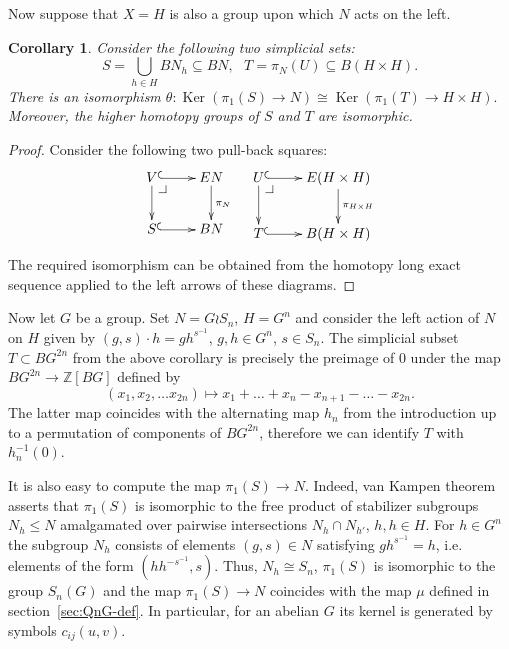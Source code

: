 \documentclass[oneside, 10pt]{amsart}
\makeatletter
\theoremstyle{plain}
\numberwithin{equation}{section}
\numberwithin{lemma}{section}
\newtheorem{cor}[lemma]{Corollary}
\theoremstyle{remark}
\theoremstyle{definition}
\DeclareMathOperator{\Ker}{Ker}
\newcommand{\ZZ}{\mathbb{Z}}
\newcommand{\pullbackcorner}[1][dr]{\save*!/#1-1.2pc/#1:(-1,1)@^{|-}\restore}
\makeatother
\begin{document}
Now suppose that $X=H$ is also a group upon which $N$ acts on the left.
\begin{cor} \label{cor:ker-iso}
Consider the following two simplicial sets:
\[ S = \bigcup\limits_{h\in H} BN_h \subseteq BN,\ \ \ T = \pi_N(U) \subseteq B(H \times H).\]
There is an isomorphism $\theta\colon \Ker(\pi_1(S) \to N) \cong \Ker(\pi_1(T) \to H \times H).$
Moreover, the higher homotopy groups of $S$ and $T$ are isomorphic. 
\end{cor}
\begin{proof}
Consider the following two pull-back squares:
\[ \xymatrix{ V  \ar@{^{(}->}[r] \ar[d] \pullbackcorner & \ar[d]^{\pi_N} EN \\
              S \ar@{^{(}->}[r] & BN } \ \ \ 
   \xymatrix{ U  \ar@{^{(}->}[r] \ar[d] \pullbackcorner & \ar[d]^{\pi_{H \times H}} E(H \times H) \\
              T \ar@{^{(}->}[r] & B(H \times H)}\] 
The required isomorphism can be obtained from the homotopy long exact sequence applied to the left arrows of these diagrams.\end{proof}

Now let $G$ be a group. Set $N = G \wr S_n$, $H = G^n$ and consider the left action of $N$ on $H$ given by $(g, s) \cdot h = gh^{s^{-1}}$, $g, h\in G^n$, $s\in S_n$.
The simplicial subset $T \subset BG^{2n}$ from the above corollary is precisely the preimage of $0$ under
 the map $BG^{2n} \to \ZZ[BG]$ defined by \[(x_1, x_2, \ldots x_{2n}) \mapsto x_1 + \ldots + x_n - x_{n+1} - \ldots - x_{2n}.\] 
The latter map coincides with the alternating map $h_n$ from the introduction up to a permutation of components of $BG^{2n}$,
 therefore we can identify $T$ with $h_n^{-1}(0)$.

It is also easy to compute the map $\pi_1(S) \to N$. Indeed, van Kampen theorem~\cite[Theorem~2.7]{May99} asserts that
$\pi_1(S)$ is isomorphic to the free product of stabilizer subgroups $N_{h} \leq N$ amalgamated over pairwise intersections $N_h \cap N_{h'}$, $h, h\in H$.
For $h \in G^n$ the subgroup $N_h$ consists of elements $(g, s) \in N$ satisfying $gh^{s^{-1}} = h$, i.e. elements of the form $(hh^{-s^{-1}}, s)$.
Thus, $N_h\cong S_n$, $\pi_1(S)$ is isomorphic to the group $S_n(G)$ and the map $\pi_1(S) \to N$ coincides with the map $\mu$ defined in section~\ref{sec:QnG-def}.
In particular, for an abelian $G$ its kernel is generated by symbols $c_{ij}(u, v)$.
\end{document}
